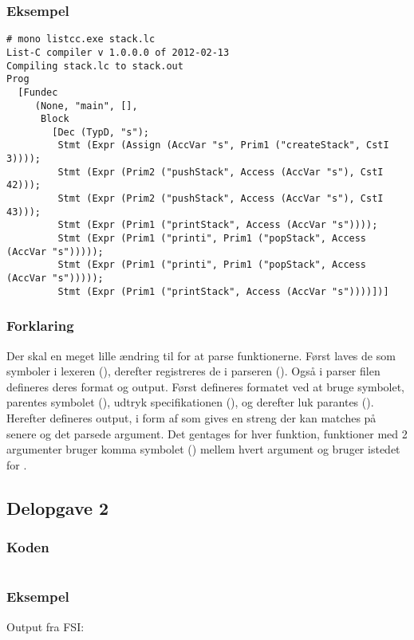 \subsubsection{Eksempel}
\begin{lstlisting}
# mono listcc.exe stack.lc
List-C compiler v 1.0.0.0 of 2012-02-13
Compiling stack.lc to stack.out
Prog
  [Fundec
     (None, "main", [],
      Block
        [Dec (TypD, "s");
         Stmt (Expr (Assign (AccVar "s", Prim1 ("createStack", CstI 3))));
         Stmt (Expr (Prim2 ("pushStack", Access (AccVar "s"), CstI 42)));
         Stmt (Expr (Prim2 ("pushStack", Access (AccVar "s"), CstI 43)));
         Stmt (Expr (Prim1 ("printStack", Access (AccVar "s"))));
         Stmt (Expr (Prim1 ("printi", Prim1 ("popStack", Access (AccVar "s")))));
         Stmt (Expr (Prim1 ("printi", Prim1 ("popStack", Access (AccVar "s")))));
         Stmt (Expr (Prim1 ("printStack", Access (AccVar "s"))))])]
\end{lstlisting}

\subsubsection{Forklaring}
Der skal en meget lille ændring til for at parse funktionerne. Først laves de som symboler i lexeren (), derefter registreres de i parseren (). Også i parser filen defineres deres format og output. Først defineres formatet ved at bruge symbolet, parentes symbolet (), udtryk specifikationen (), og derefter luk parantes (). Herefter defineres output, i form af  som gives en streng der kan matches på senere og det parsede argument. Det gentages for hver funktion, funktioner med 2 argumenter bruger komma symbolet () mellem hvert argument og bruger  istedet for .

\subsection{Delopgave 2}\label{ass:1-2}
\subsubsection{Koden}
\begin{lstlisting}[language=fsharp]

\end{lstlisting}

\subsubsection{Eksempel}
Output fra FSI:
\begin{lstlisting}

\end{lstlisting}

